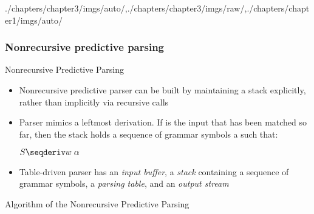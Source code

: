 \begin{graphicspathcontext}{{./chapters/chapter3/imgs/auto/},{./chapters/chapter3/imgs/raw/},{./chapters/chapter1/imgs/auto/}}
\begin{bibunit}[apalike]
\subsubsection{Nonrecursive predictive parsing}
\subsubsectiontableofcontentslide

\begin{frame}{Nonrecursive Predictive Parsing}
	\begin{itemize}
	\item Nonrecursive predictive parser can be built by maintaining a stack explicitly, rather than implicitly via recursive calls
	\item Parser mimics a leftmost derivation. If  is the input that has been matched so far, then the stack holds a sequence of grammar symbols a such that:
		\begin{center}
			$S \seqderiv w\;\alpha$
		\end{center}
	\item Table-driven parser has an \emph{input buffer}, a \emph{stack} containing a sequence of grammar symbols, a \emph{parsing table}, and an \emph{output stream}
	\end{itemize}
	\begin{center}
	\end{center}
\end{frame}

\begin{frame}[t]{Algorithm of the Nonrecursive Predictive Parsing}
	\begin{scriptsize}
	\begin{myalgorithm}
	\BlankLine
	\end{myalgorithm}
	\end{scriptsize}
\end{frame}


\end{bibunit}
\end{graphicspathcontext}
